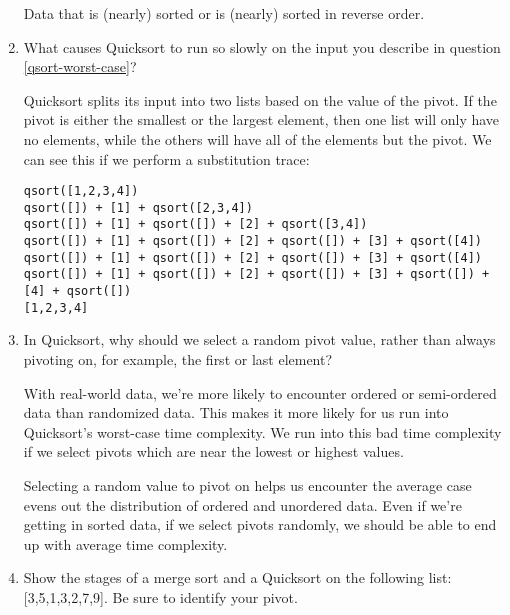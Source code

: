 \documentclass[11pt]{article}
\newenvironment{answer}{\large\lstset{basicstyle=\tiny\ttfamily}\color{white}}{}
\newenvironment{answer}{\large\lstset{basicstyle=\large\ttfamily}\color{red}}{}
\begin{document}
\begin{enumerate}
      \begin{answer}
      Data that is (nearly) sorted or is (nearly) sorted in reverse order.
      \end{answer}

\item What causes Quicksort to run so slowly on the input you describe in
      question \ref{qsort-worst-case}?

    \begin{answer}
    Quicksort splits its input into two lists based on the value of the pivot.
    If the pivot is either the smallest or the largest element, then one list
    will only have no elements, while the others will have all of the elements
    but the pivot. We can see this if we perform a substitution trace:
\begin{verbatim}
qsort([1,2,3,4])
qsort([]) + [1] + qsort([2,3,4])
qsort([]) + [1] + qsort([]) + [2] + qsort([3,4])
qsort([]) + [1] + qsort([]) + [2] + qsort([]) + [3] + qsort([4])
qsort([]) + [1] + qsort([]) + [2] + qsort([]) + [3] + qsort([4])
qsort([]) + [1] + qsort([]) + [2] + qsort([]) + [3] + qsort([]) + [4] + qsort([])
[1,2,3,4]
\end{verbatim}
    \end{answer}

\item In Quicksort, why should we select a random pivot value, rather than always
      pivoting on, for example, the first or last element?

      \begin{answer}
      With real-world data, we're more likely to encounter ordered or
      semi-ordered data than randomized data. This makes it more likely for us
      run into Quicksort's worst-case time complexity. We run into this bad
      time complexity if we select pivots which are near the lowest or highest
      values.

      Selecting a random value to pivot on helps us encounter the average case
      evens out the distribution of ordered and unordered data. Even if we're
      getting in sorted data, if we select pivots randomly, we should be able
      to end up with average time complexity.
      \end{answer}
      
\newpage
\item Show the stages of a merge sort and a Quicksort on the following list:
      [3,5,1,3,2,7,9]. Be sure to identify your pivot.


\end{enumerate}
\end{document}
